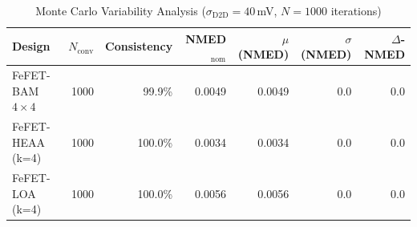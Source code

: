 \begin{table}[t]
\centering
\caption{Monte Carlo Variability Analysis ($\sigma_\mathrm{D2D} = 40$\,mV, $N=1000$ iterations)}
\label{tab:monte_carlo}
\begin{tabular}{lrrrrrr}
\toprule
Design & $N_\mathrm{conv}$ & Consistency & NMED$_\mathrm{nom}$ & $\mu$(NMED) & $\sigma$(NMED) & $\Delta$-NMED \\
\midrule
FeFET-BAM $4{\times}4$ & 1000 & 99.9\% & 0.0049 & 0.0049 & 0.0 & 0.0 \\
FeFET-HEAA (k=4) & 1000 & 100.0\% & 0.0034 & 0.0034 & 0.0 & 0.0 \\
FeFET-LOA (k=4) & 1000 & 100.0\% & 0.0056 & 0.0056 & 0.0 & 0.0 \\
\bottomrule
\end{tabular}
\end{table}